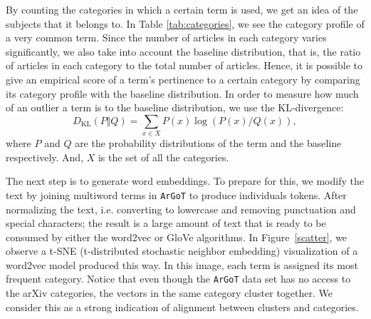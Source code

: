 \documentclass[submission,copyright,creativecommons]{eptcs}
\newcommand{\argot}{\texttt{ArGoT}\xspace}
\begin{document}
By counting the categories in which a certain term is used, we get an
idea of the subjects that it belongs to. In Table
\ref{tab:categories}, we see the category profile of a very common
term. Since the number of articles in each category varies
significantly, we also take into account the baseline distribution,
that is, the ratio of articles in each category to the total number of
articles.
Hence, it is possible to give an empirical score of a term's
pertinence to a certain category by comparing its category profile
with the baseline distribution. In order to measure how much of an 
outlier a term is to the baseline distribution, we use the KL-divergence:
$$D_{\text{KL}}(P \Vert Q) = \sum_{x\in X} P(x)\log(P(x)/Q(x)),$$
where $P$ and $Q$ are the probability distributions of the term and the baseline respectively. And, $X$ is the set of all the categories.


The next step is to generate word embeddings. To prepare for this, we modify the text by joining multiword terms in \argot to produce individuals tokens. After normalizing the text, i.e. converting to lowercase and removing punctuation and special characters; the result is a large amount of text that is ready to be consumed by either the word2vec or GloVe algorithms. 
In Figure~\ref{scatter}, we observe a t-SNE (t-distributed stochastic
neighbor embedding) visualization of a word2vec 
model produced this way. In this image, each term is assigned its most frequent category. Notice that even though the \argot data set has no access to the arXiv categories, the vectors in the same category cluster together.
We consider this as a strong indication of alignment between clusters and categories.
\end{document}
